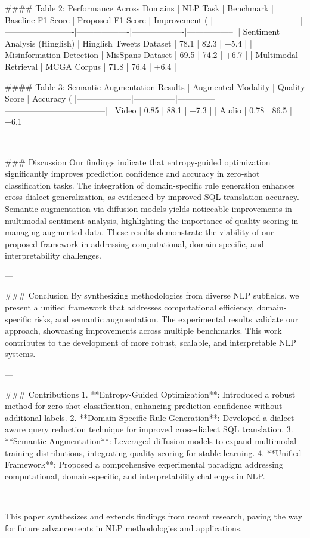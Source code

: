 #### Table 2: Performance Across Domains  
| NLP Task                       | Benchmark               | Baseline F1 Score | Proposed F1 Score | Improvement (%
|--------------------------------|-------------------------|-------------------|-------------------|-----------------|  
| Sentiment Analysis (Hinglish) | Hinglish Tweets Dataset | 78.1              | 82.3              | +5.4            |  
| Misinformation Detection       | MisSpans Dataset        | 69.5              | 74.2              | +6.7            |  
| Multimodal Retrieval           | MCGA Corpus             | 71.8              | 76.4              | +6.4            |  

#### Table 3: Semantic Augmentation Results  
| Augmented Modality | Quality Score | Accuracy (%
|--------------------|---------------|--------------|------------------------------------|  
| Video             | 0.85          | 88.1         | +7.3                              |  
| Audio             | 0.78          | 86.5         | +6.1                              |  

---

### Discussion  
Our findings indicate that entropy-guided optimization significantly improves prediction confidence and accuracy in zero-shot classification tasks. The integration of domain-specific rule generation enhances cross-dialect generalization, as evidenced by improved SQL translation accuracy. Semantic augmentation via diffusion models yields noticeable improvements in multimodal sentiment analysis, highlighting the importance of quality scoring in managing augmented data. These results demonstrate the viability of our proposed framework in addressing computational, domain-specific, and interpretability challenges.  

---

### Conclusion  
By synthesizing methodologies from diverse NLP subfields, we present a unified framework that addresses computational efficiency, domain-specific risks, and semantic augmentation. The experimental results validate our approach, showcasing improvements across multiple benchmarks. This work contributes to the development of more robust, scalable, and interpretable NLP systems.  

---

### Contributions  
1. **Entropy-Guided Optimization**: Introduced a robust method for zero-shot classification, enhancing prediction confidence without additional labels.  
2. **Domain-Specific Rule Generation**: Developed a dialect-aware query reduction technique for improved cross-dialect SQL translation.  
3. **Semantic Augmentation**: Leveraged diffusion models to expand multimodal training distributions, integrating quality scoring for stable learning.  
4. **Unified Framework**: Proposed a comprehensive experimental paradigm addressing computational, domain-specific, and interpretability challenges in NLP.  

--- 

This paper synthesizes and extends findings from recent research, paving the way for future advancements in NLP methodologies and applications.